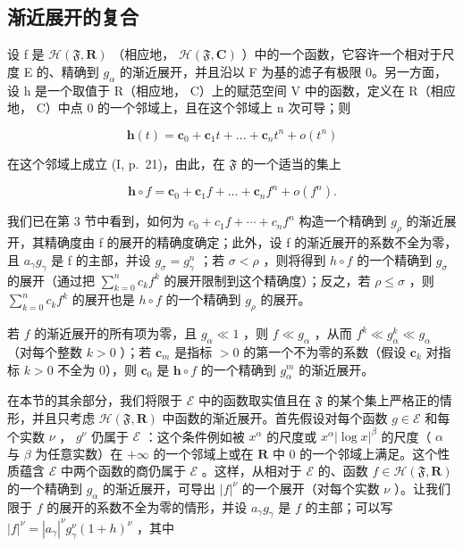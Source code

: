 \subsection{渐近展开的复合}

设 f 是 \(\mathcal{H}(\mathfrak{F},\mathbf{R})\) （相应地， \(\mathcal{H}(\mathfrak{F},\mathbf{C})\) ）中的一个函数，它容许一个相对于尺度 E 的、精确到 \(g_{\alpha}\) 的渐近展开，并且沿以 F 为基的滤子有极限 0。另一方面，设 h 是一个取值于 R（相应地， C）上的赋范空间 V 中的函数，定义在 R（相应地， C）中点 0 的一个邻域上，且在这个邻域上 n 次可导；则

\[
\mathbf {h} (t) = \mathbf {c} _ {0} + \mathbf {c} _ {1} t + \dots + \mathbf {c} _ {n} t ^ {n} + o (t ^ {n})
\]

在这个邻域上成立 (I, p.~21)，由此，在 \(\mathfrak{F}\) 的一个适当的集上

\[
\mathbf {h} \circ f = \mathbf {c} _ {0} + \mathbf {c} _ {1} f + \dots + \mathbf {c} _ {n} f ^ {n} + o (f ^ {n}).
\]

我们已在第 3 节中看到，如何为 \(c_{0} + c_{1}f + \cdots + c_{n}f^{n}\) 构造一个精确到 \(g_{\rho}\) 的渐近展开，其精确度由 f 的展开的精确度确定；此外，设 f 的渐近展开的系数不全为零，且 \(a_{\gamma}g_{\gamma}\) 是 f 的主部，并设 \(g_{\sigma} = g_{\gamma}^{n}\) ；若 \(\sigma < \rho\) ，则将得到 \(h \circ f\) 的一个精确到 \(g_{\sigma}\) 的展开（通过把 \(\sum_{k=0}^{n} c_{k}f^{k}\) 的展开限制到这个精确度）；反之，若 \(\rho \leqslant \sigma\) ，则 \(\sum_{k=0}^{n} c_{k}f^{k}\) 的展开也是 \(h \circ f\) 的一个精确到 \(g_{\rho}\) 的展开。

若 \(f\) 的渐近展开的所有项为零，且 \(g_{\alpha} \ll 1\) ，则 \(f \ll g_{\alpha}\) ，从而 \(f^k \ll g_{\alpha}^k \ll g_{\alpha}\) （对每个整数 \(k > 0\) ）；若 \(\mathbf{c}_m\) 是指标 \(> 0\) 的第一个不为零的系数（假设 \(\mathbf{c}_k\) 对指标 \(k > 0\) 不全为 0），则 \(\mathbf{c}_0\) 是 \(\mathbf{h} \circ f\) 的一个精确到 \(g_{\alpha}^{m}\) 的渐近展开。

在本节的其余部分，我们将限于 \(\mathcal{E}\) 中的函数取实值且在 \(\mathfrak{F}\) 的某个集上严格正的情形，并且只考虑 \(\mathcal{H}(\mathfrak{F},\mathbf{R})\) 中函数的渐近展开。首先假设对每个函数 \(g\in \mathcal{E}\) 和每个实数 \(\nu\) ， \(g^{\nu}\) 仍属于 \(\mathcal{E}\) ：这个条件例如被 \(x^{\alpha}\) 的尺度或 \(x^{\alpha}|\log x|^{\beta}\) 的尺度（ \(\alpha\) 与 \(\beta\) 为任意实数）在 \(+\infty\) 的一个邻域上或在 \(\mathbf{R}\) 中 0 的一个邻域上满足。这个性质蕴含 \(\mathcal{E}\) 中两个函数的商仍属于 \(\mathcal{E}\) 。这样，从相对于 \(\mathcal{E}\) 的、函数 \(f\in \mathcal{H}(\mathfrak{F},\mathbf{R})\) 的一个精确到 \(g_{\alpha}\) 的渐近展开，可导出 \(|f|^{\nu}\) 的一个展开（对每个实数 \(\nu\) ）。让我们限于 \(f\) 的展开的系数不全为零的情形，并设 \(a_{\gamma}g_{\gamma}\) 是 \(f\) 的主部；可以写 \(|f|^{\nu} = |a_{\gamma}|^{\nu}g_{\gamma}^{\nu}(1 + h)^{\nu}\) ，其中


